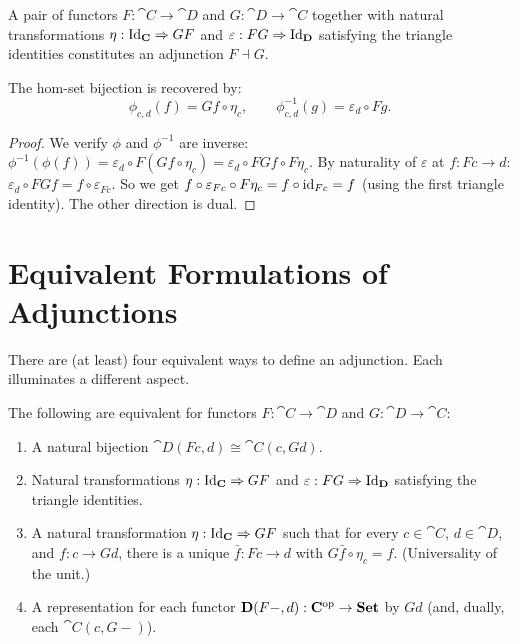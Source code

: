 \begin{theorem}
A pair of functors $F: \cat{C} \to \cat{D}$ and $G: \cat{D} \to \cat{C}$ together with natural transformations $\eta: \mathrm{Id}_{\mathbf{C}} \Rightarrow GF$ and $\varepsilon: FG \Rightarrow \mathrm{Id}_{\mathbf{D}}$ satisfying the triangle identities constitutes an adjunction $F \dashv G$.

The hom-set bijection is recovered by:
\[
  \phi_{c,d}(f) = Gf \circ \eta_c, \qquad \phi^{-1}_{c,d}(g) = \varepsilon_d \circ Fg.
\]
\end{theorem}

\begin{proof}
We verify $\phi$ and $\phi^{-1}$ are inverse: $\phi^{-1}(\phi(f)) = \varepsilon_d \circ F(Gf \circ \eta_c) = \varepsilon_d \circ FGf \circ F\eta_c$. By naturality of $\varepsilon$ at $f: Fc \to d$: $\varepsilon_d \circ FGf = f \circ \varepsilon_{Fc}$. So we get $f \circ \varepsilon_{Fc} \circ F\eta_c = f \circ \mathrm{id}_{Fc} = f$ (using the first triangle identity). The other direction is dual.
\end{proof}

\section{Equivalent Formulations of Adjunctions}

There are (at least) four equivalent ways to define an adjunction. Each illuminates a different aspect.

\begin{theorem}
The following are equivalent for functors $F: \cat{C} \to \cat{D}$ and $G: \cat{D} \to \cat{C}$:
\begin{enumerate}
  \item[(i)] A natural bijection $\cat{D}(Fc,d) \cong \cat{C}(c, Gd)$.
  \item[(ii)] Natural transformations $\eta: \mathrm{Id}_{\mathbf{C}} \Rightarrow GF$ and $\varepsilon: FG \Rightarrow \mathrm{Id}_{\mathbf{D}}$ satisfying the triangle identities.
  \item[(iii)] A natural transformation $\eta: \mathrm{Id}_{\mathbf{C}} \Rightarrow GF$ such that for every $c \in \cat{C}$, $d \in \cat{D}$, and $f: c \to Gd$, there is a unique $\bar{f}: Fc \to d$ with $G\bar{f} \circ \eta_c = f$. (Universality of the unit.)
  \item[(iv)] A representation for each functor $\mathbf{D}(F-,d): \mathbf{C}^{\mathrm{op}} \to \mathbf{Set}$ by $Gd$ (and, dually, each $\cat{C}(c,G-)$).
\end{enumerate}
\end{theorem}


